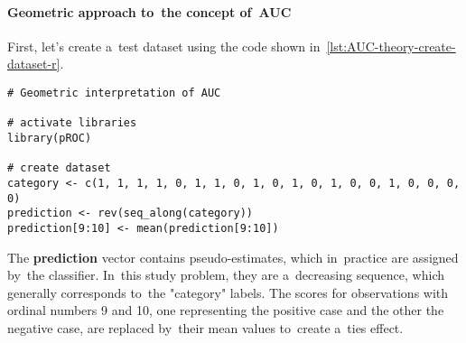 \documentclass[]{scrreprt}
\begin{document}
\paragraph{Geometric approach to~the concept of~AUC}
First, let's create a~test dataset using the code shown in~\ref{lst:AUC-theory-create-dataset-r}.
%
\begin{lstlisting}[float, caption = Create a~test data set, firstnumber=1, label= lst:AUC-theory-create-dataset-r]
# Geometric interpretation of AUC

# activate libraries
library(pROC)

# create dataset
category <- c(1, 1, 1, 1, 0, 1, 1, 0, 1, 0, 1, 0, 1, 0, 0, 1, 0, 0, 0, 0)
prediction <- rev(seq_along(category))
prediction[9:10] <- mean(prediction[9:10])
\end{lstlisting}
%
The \textbf{prediction} vector contains pseudo-estimates, which in~practice are assigned by~the classifier. In~this study problem, they are a~decreasing sequence, which generally corresponds to~the "category" labels. The scores for observations with ordinal numbers 9 and 10, one representing the positive case and the other the negative case, are replaced by~their mean values to~create a~ties effect.
\end{document}
